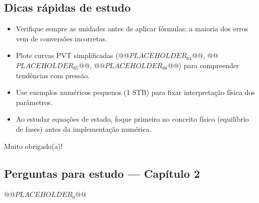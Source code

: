 \documentclass[11pt,a4paper]{article}
\begin{document}
\subsection{Dicas rápidas de estudo}
\begin{itemize}
\item Verifique sempre as unidades antes de aplicar fórmulas; a maioria dos erros vem de conversões incorretas.
\item Plote curvas PVT simplificadas (@@$PLACEHOLDER_{64}$@@, @@$PLACEHOLDER_{65}$@@, @@$PLACEHOLDER_{66}$@@) para compreender tendências com pressão.
\item Use exemplos numéricos pequenos (1 STB) para fixar interpretação física dos parâmetros.
\item Ao estudar equações de estado, foque primeiro no conceito físico (equilíbrio de fases) antes da implementação numérica.
\end{itemize}


Muito obrigado(a)!
\clearpage
\subsection*{Perguntas para estudo --- Capítulo 2}
@@$PLACEHOLDER_{0}$@@

\clearpage
\end{document}
